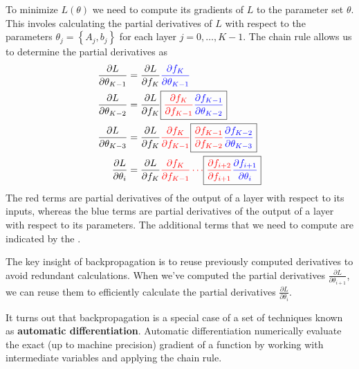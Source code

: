 \documentclass{article}
\begin{document}
To minimize $L(\theta)$ we need to compute its gradients of $L$ to the
parameter set $\theta$. This involes calculating the partial derivatives of
$L$ with respect to the parameters $\theta_j=\left\{A_j,b_j\right\}$ for each
layer $j=0,\ldots,K-1$. The chain rule allows us to determine the partial
derivatives as
$$\begin{aligned}
    \frac{\partial{L}}{\partial{\theta_{K-1}}}&=\frac{\partial{L}}{\partial{f_K}}{\color{blue}\frac{\partial{f_K}}{\partial{\theta_{K-1}}}}
    \\
    \frac{\partial{L}}{\partial{\theta_{K-2}}}&=\frac{\partial{L}}{\partial{f_K}}\boxed{{\color{red}\frac{\partial{f_K}}{\partial{f_{K-1}}}}{\color{blue}\frac{\partial{f_{K-1}}}{\partial{\theta_{K-2}}}}}
    \\
    \frac{\partial{L}}{\partial{\theta_{K-3}}}&=\frac{\partial{L}}{\partial{f_K}}{\color{red}\frac{\partial{f_K}}{\partial{f_{K-1}}}}\boxed{{\color{red}\frac{\partial{f_{K-1}}}{\partial{f_{K-2}}}}{\color{blue}\frac{\partial{f_{K-2}}}{\partial{\theta_{K-3}}}}}
    \\
    \frac{\partial{L}}{\partial{\theta_{i}}}&=\frac{\partial{L}}{\partial{f_K}}{\color{red}\frac{\partial{f_K}}{\partial{f_{K-1}}}\cdots}\boxed{{\color{red}\frac{\partial{f_{i+2}}}{\partial{f_{i+1}}}}{\color{blue}\frac{\partial{f_{i+1}}}{\partial{\theta_{i}}}}}
\end{aligned}$$
The {\color{red}red} terms are partial derivatives of the output of a layer
with respect to its inputs, whereas the {\color{blue}blue} terms are partial
derivatives of the output of a layer with respect to its parameters. The
additional terms that we need to compute are indicated by the .

The key insight of backpropagation is to reuse previously computed derivatives
to avoid redundant calculations. When we've computed the partial derivatives
$\frac{\partial{L}}{\partial{\theta_{i+1}}}$, we can reuse them to efficiently
calculate the partial derivatives
$\frac{\partial{L}}{\partial{\theta}_{i}}$.

It turns out that backpropagation is a special case of a set of techniques
known as \textbf{automatic differentiation}. Automatic differentiation
numerically evaluate the exact (up to machine precision) gradient of a function by working with
intermediate variables and applying the chain rule.
\end{document}
